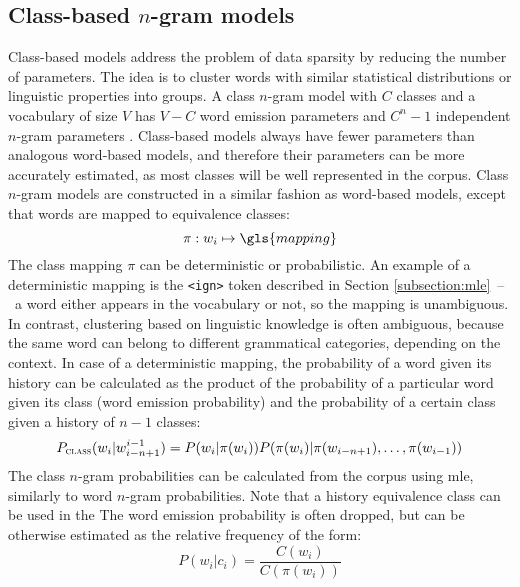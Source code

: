 	\subsection{Class-based \mbox{$n$-gram} models}
	\label{subsection:class}
	Class-based models address the problem of data sparsity by reducing the number of parameters. The idea is to cluster words with similar statistical distributions or linguistic properties into groups. A class \mbox{$n$-gram} model with $C$ classes and a vocabulary of size $V$ has $V-C$ word emission parameters and $C^{n}-1$ independent \mbox{$n$-gram} parameters \cite{brown1992class}. Class-based models always have fewer parameters than analogous word-based models, and therefore their parameters can be more accurately estimated, as most classes will be well represented in the corpus. Class \mbox{$n$-gram} models are constructed in a similar fashion as word-based models, except that words are mapped to equivalence classes: 
	\begin{equation}
		\pi:w_{i}\mapsto \gls{mapping}
		\label{equation:deterministic_class}
	\end{equation}
	The class mapping $\pi$ can be deterministic or probabilistic. An example of a deterministic mapping is the \texttt{<ign>} token described in Section \ref{subsection:mle}~--~a word either appears in the vocabulary or not, so the mapping is unambiguous. In contrast, clustering based on linguistic knowledge is often ambiguous, because the same word can belong to different grammatical categories, depending on the context. 
	In case of a deterministic mapping, the probability of a word given its history can be calculated as the product of the probability of a particular word given its class (word emission probability) and the probability of a certain class given a history of $n-1$ classes:
	\begin{equation}
		P_{\textsc{class}}(w_{i}|w_{i-n+1}^{i-1})=P(w_{i}|\pi(w_{i}))P(\pi(w_{i})|\pi(w_{i-n+1}), \dots, \pi(w_{i-1}))
		\label{equation:classngram}
	\end{equation}
	The class \mbox{$n$-gram} probabilities can be calculated from the corpus using \gls{mle}, similarly to word \mbox{$n$-gram} probabilities. Note that a history equivalence class can be used in the The word emission probability is often dropped, but can be otherwise estimated as the relative frequency of the form:
	\begin{equation}
		P(w_{i}|c_{i})=\frac{C(w_{i})}{C(\pi(w_{i}))}
		\label{equation:emission_probability}
	\end{equation}
